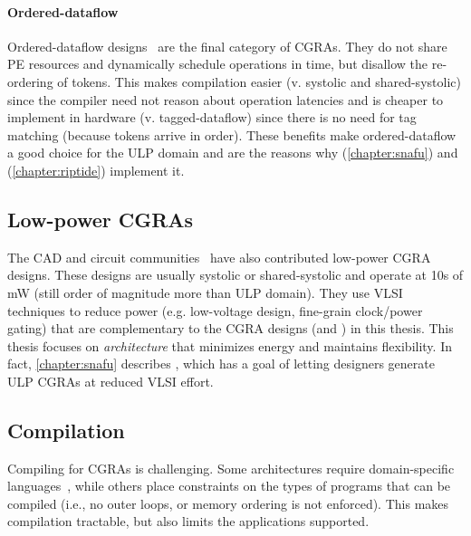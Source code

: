 \paragraph{Ordered-dataflow}
Ordered-dataflow designs~\cite{snafu,plasticine,dyser} are the final category of CGRAs.
% 
They do not share PE resources and dynamically schedule operations in time, but disallow the re-ordering of tokens.
% 
This makes compilation easier (v. systolic and shared-systolic) since the compiler need not reason about operation latencies and is cheaper to implement in hardware (v. tagged-dataflow) since there is no need for tag matching (because tokens arrive in order).
% 
These benefits make ordered-dataflow a good choice for the ULP domain and are the reasons why \snafu (\autoref{chapter:snafu}) and \riptide (\autoref{chapter:riptide}) implement it.

\subsection{Low-power CGRAs}
The CAD and circuit communities~\cite{ipa,cma,srp,karunaratne2017hycube} have also contributed low-power CGRA designs.
% 
These designs are usually systolic or shared-systolic and operate at 10s of mW (still order of magnitude more than ULP domain).
% 
They use VLSI techniques to reduce power (e.g. low-voltage design, fine-grain clock/power gating) that are complementary to the CGRA designs (\snafu and \riptide) in this thesis.
%
This thesis focuses on {\em architecture} that minimizes energy and maintains flexibility.
%
In fact, \autoref{chapter:snafu} describes \snafu, which has a goal of letting designers generate ULP CGRAs at reduced VLSI effort.

\subsection{Compilation}
Compiling for CGRAs is challenging.
% 
Some architectures require domain-specific languages~\cite{id,delite}, while others place constraints on the types of programs that can be compiled (i.e., no outer loops, or memory ordering is not enforced).
% 
This makes compilation tractable, but also limits the applications supported.

